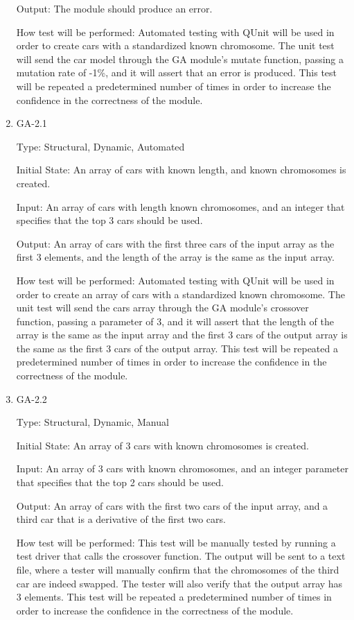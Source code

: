 \documentclass[12pt, titlepage]{article}
\begin{document}
\begin{enumerate}
Output: The module should produce an error.
					
How test will be performed: Automated testing with QUnit will be used in order 
to create cars with a standardized known chromosome. The unit test will send the 
car model through the GA module's mutate function, passing a mutation rate of 
-1\%, and it will assert that an error is produced. This test will be repeated  
a predetermined number of times in order to increase the confidence in the 
correctness of the module.

\item{GA-2.1\\}

Type: Structural, Dynamic, Automated
					
Initial State: An array of cars with known length, and known chromosomes is 
created.
					
Input: An array of cars with length known chromosomes, and an integer that 
specifies that the top 3 cars should be used.
					
Output: An array of cars with the first three cars of the input array as the 
first 3 elements, and the length of the array is the same as the input array.
					
How test will be performed: Automated testing with QUnit will be used in order 
to create an array of cars with a standardized known chromosome. The unit test 
will send the cars array through the GA module's crossover function, passing a 
parameter of 3, and it will assert that the length of the array is the same as 
the input array and the first 3 cars of the output array is the same as the 
first 3 cars of the output array. This test will be repeated  a predetermined 
number of times in order to increase the confidence in the correctness of the 
module.

\item{GA-2.2\\}

Type: Structural, Dynamic, Manual
					
Initial State: An array of 3 cars with known chromosomes is created.
					
Input: An array of 3 cars with known chromosomes, and an integer parameter that 
specifies that the top 2 cars should be used.
					
Output: An array of cars with the first two cars of the input array, and a third 
car that is a derivative of the first two cars.
					
How test will be performed: This test will be manually tested by running a test 
driver that calls the crossover function. The output will be sent to a text 
file, where a tester will manually confirm that the chromosomes of the third car 
are indeed swapped. The tester will also verify that the output array has 3 
elements. This test will be repeated a predetermined number of times in order to 
increase the confidence in the correctness of the module.


\end{enumerate}
\end{document}
